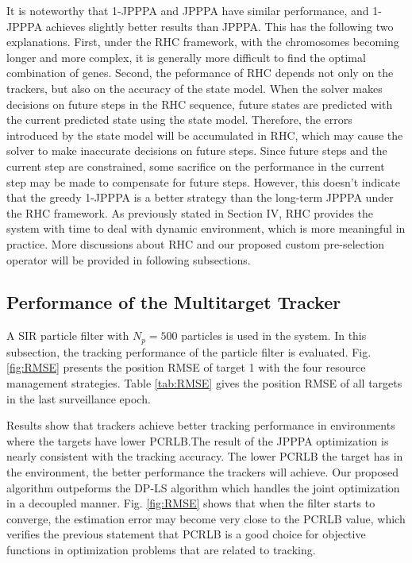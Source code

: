 \documentclass[12pt,journal,draftclsnofoot,onecolumn]{IEEEtran}
\begin{document}
It is noteworthy that 1-JPPPA and JPPPA have similar performance, and 1-JPPPA achieves slightly better results than JPPPA. This has the following two explanations. First, under the RHC framework, with the chromosomes becoming longer and more complex, it is generally more difficult to find the optimal combination of genes. Second, the peformance of RHC depends not only on the trackers, but also on the accuracy of the state model. When the solver makes decisions on future steps in the RHC sequence, future states are predicted with the current predicted state using the state model. Therefore, the errors introduced by the state model will be accumulated in RHC, which may cause the solver to make inaccurate decisions on future steps. Since future steps and the current step are constrained, some sacrifice on the performance in the current step may be made to compensate for future steps. However, this doesn't indicate that the greedy 1-JPPPA is a better strategy than the long-term JPPPA under the RHC framework. As previously stated in Section IV, RHC provides the system with time to deal with dynamic environment, which is more meaningful in practice. More discussions about RHC and our proposed custom pre-selection operator will be provided in following subsections.





\subsection{Performance of the Multitarget Tracker}
A SIR particle filter with $N_p=500$ particles is used in the system. In this subsection, the tracking performance of the particle filter is evaluated. Fig. \ref{fig:RMSE} presents the position RMSE of target 1 with the four resource management strategies. Table \ref{tab:RMSE} gives the position RMSE of all targets in the last surveillance epoch.

Results show that trackers achieve better tracking performance in environments where the targets have lower PCRLB.The result of the JPPPA optimization is nearly consistent with the tracking accuracy. The lower PCRLB the target has in the environment, the better performance the trackers will achieve. Our proposed algorithm outpeforms the DP-LS algorithm which handles the joint optimization in a decoupled manner. Fig. \ref{fig:RMSE} shows that when the filter starts to converge, the estimation error may become very close to the PCRLB value, which verifies the previous statement that PCRLB is a good choice for objective functions in optimization problems that are related to tracking. 
\end{document}

